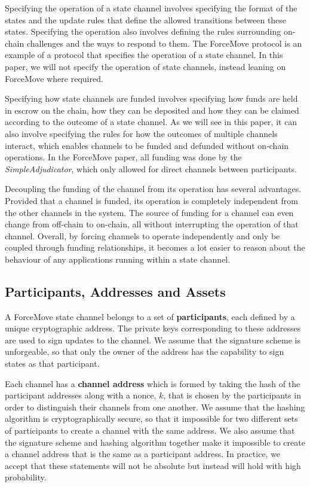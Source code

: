 \documentclass{article}
\begin{document}
Specifying the operation of a state channel involves specifying the format of the states and the update rules that define the allowed transitions between these states.
Specifying the operation also involves defining the rules surrounding on-chain challenges and the ways to respond to them.
The ForceMove protocol is an example of a protocol that specifies the operation of a state channel.
In this paper, we will not specify the operation of state channels, instead leaning on ForceMove where required.

Specifying how state channels are funded involves specifying how funds are held in escrow on the chain, how they can be deposited and how they can be claimed according to the outcome of a state channel.
As we will see in this paper, it can also involve specifying the rules for how the outcomes of multiple channels interact, which enables channels to be funded and defunded without on-chain operations.
In the ForceMove paper, all funding was done by the \textit{SimpleAdjudicator}, which only allowed for direct channels between participants.

Decoupling the funding of the channel from its operation has several advantages.
Provided that a channel is funded, its operation is completely independent from the other channels in the system.
The source of funding for a channel can even change from off-chain to on-chain, all without interrupting the operation of that channel.
Overall, by forcing channels to operate independently and only be coupled through funding relationships, it becomes a lot easier to reason about the behaviour of any applications running within a state channel.


\subsection{Participants, Addresses and Assets}

A ForceMove state channel belongs to a set of \textbf{participants}, each defined by a unique cryptographic address.
The private keys corresponding to these addresses are used to sign updates to the channel.
We assume that the signature scheme is unforgeable, so that only the owner of the address has the capability to sign states as that participant.

Each channel has a \textbf{channel address} which is formed by taking the hash of the participant addresses along with a nonce, $k$, that is chosen by the participants in order to distinguish their channels from one another.
We assume that the hashing algorithm is cryptographically secure, so that it impossible for two different sets of participants to create a channel with the same address.
We also assume that the signature scheme and hashing algorithm together make it impossible to create a channel address that is the same as a participant address.
In practice, we accept that these statements will not be absolute but instead will hold with high probability.
\end{document}

